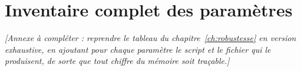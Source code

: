 \chapter{Inventaire complet des paramètres}
\label{ann:parametres}

\textit{[Annexe à compléter : reprendre le tableau du chapitre~\ref{ch:robustesse} en
version exhaustive, en ajoutant pour chaque paramètre le script et le fichier qui le
produisent, de sorte que tout chiffre du mémoire soit traçable.]}

%
